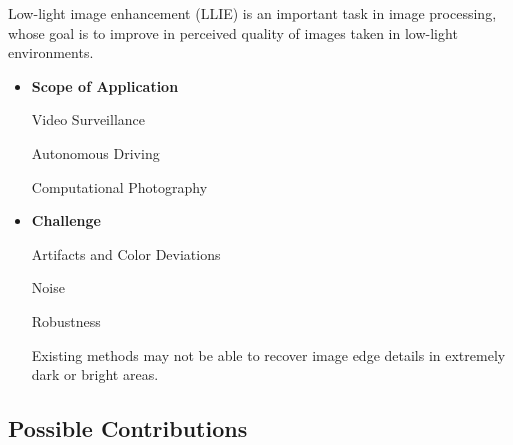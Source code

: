 \documentclass[CJK,aspectratio=169]{beamer}  %
\begin{document}
	\begin{frame}

		Low-light image enhancement (LLIE) is an important task in image processing, whose goal is to improve in perceived quality of images taken in low-light environments.
		

		\begin{itemize} 
			\item \textbf{Scope of Application}

			Video Surveillance 
				
			Autonomous Driving
				          			
			Computational Photography
		\end{itemize}
		
			
		\begin{itemize} 
			\item \textbf{Challenge}
				
			Artifacts and Color Deviations 
				
			Noise
				
			Robustness
			
			Existing methods may not be able to recover image edge details in extremely dark or bright areas.
			
				
		\end{itemize}
	\end{frame}
	
	\subsection{Possible Contributions}
	
\end{document}

